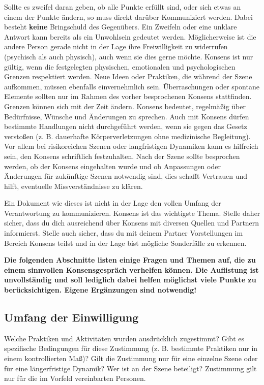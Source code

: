 \documentclass[a4paper,12pt]{article}
\begin{document}
Sollte es zweifel daran geben, ob alle Punkte erfüllt sind, oder sich etwas an einem der Punkte ändern, so muss direkt darüber Kommuniziert werden. Dabei besteht \textbf{keine} Bringschuld des Gegenübers. Ein Zweifeln oder eine unklare Antwort kann bereits als ein Unwohlsein gedeutet werden. Möglicherweise ist die andere Person gerade nicht in der Lage ihre Freiwilligkeit zu widerrufen (psychisch als auch physisch), auch wenn sie dies gerne möchte. Konsens ist nur gültig, wenn die festgelegten physischen, emotionalen und psychologischen Grenzen respektiert werden. Neue Ideen oder Praktiken, die während der Szene aufkommen, müssen ebenfalls einvernehmlich sein. Überraschungen oder spontane Elemente sollten nur im Rahmen des vorher besprochenen Konsens stattfinden. Grenzen können sich mit der Zeit ändern. Konsens bedeutet, regelmäßig über Bedürfnisse, Wünsche und Änderungen zu sprechen. Auch mit Konsens dürfen bestimmte Handlungen nicht durchgeführt werden, wenn sie gegen das Gesetz verstoßen (z. B. dauerhafte Körperverletzungen ohne medizinische Begleitung). Vor allem bei risikoreichen Szenen oder langfristigen Dynamiken kann es hilfreich sein, den Konsens schriftlich festzuhalten. Nach der Szene sollte besprochen werden, ob der Konsens eingehalten wurde und ob Anpassungen oder Änderungen für zukünftige Szenen notwendig sind, dies schafft Vertrauen und hilft, eventuelle Missverständnisse zu klären.

Ein Dokument wie dieses ist nicht in der Lage den vollen Umfang der Verantwortung zu kommunizieren. Konsens ist das wichtigste Thema. Stelle daher sicher, dass du dich ausreichend über Konsens mit diversen Quellen und Partnern informierst. Stelle auch sicher, dass du mit deinem Partner Vorstellungen im Bereich Konsens teilst und in der Lage bist mögliche Sonderfälle zu erkennen.\bigbreak

\textbf{Die folgenden Abschnitte listen einige Fragen und  Themen auf, die zu einem sinnvollen Konsensgespräch verhelfen können. Die Auflistung ist unvollständig und soll lediglich dabei helfen möglichst viele Punkte zu berücksichtigen. Eigene Ergänzungen sind notwendig!}

\newpage

 \subsection{Umfang der Einwilligung}
Welche Praktiken und Aktivitäten wurden ausdrücklich zugestimmt? Gibt es spezifische Bedingungen für diese Zustimmung (z. B. bestimmte Praktiken nur in einem kontrollierten Maß)? Gilt die Zustimmung nur für eine einzelne Szene oder für eine längerfristige Dynamik? Wer ist an der Szene beteiligt? Zustimmung gilt nur für die im Vorfeld vereinbarten Personen.
\end{document}
